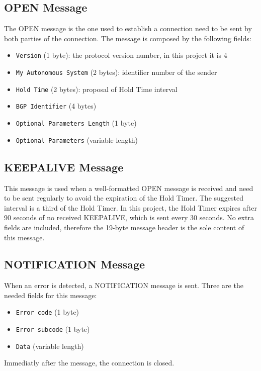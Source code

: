 \subsection{OPEN Message}
The OPEN message is the one used to establish a connection need to be sent by both parties of the connection.
The message is composed by the following fields:
\begin{itemize}
    \item \texttt{Version} (1 byte): the protocol version number, in this project it is 4
    \item \texttt{My Autonomous System} (2 bytes): identifier number of the sender
    \item \texttt{Hold Time} (2 bytes): proposal of Hold Time interval
    \item \texttt{BGP Identifier} (4 bytes)
    \item \texttt{Optional Parameters Length} (1 byte)
    \item \texttt{Optional Parameters} (variable length)
\end{itemize}


\subsection{KEEPALIVE Message}
This message is used when a well-formatted OPEN message is received and need to be sent regularly to avoid the expiration of the Hold Timer. The suggested interval is a third of the Hold Timer. In this project, the Hold Timer expires after 90 seconds of no received KEEPALIVE, which is sent every 30 seconds. No extra fields are included, therefore the 19-byte message header is the sole content of this message.


\subsection{NOTIFICATION Message}
When an error is detected, a NOTIFICATION message is sent. Three are the needed fields for this message:
\begin{itemize}
    \item \texttt{Error code} (1 byte)
    \item \texttt{Error subcode} (1 byte)
    \item \texttt{Data} (variable length)
\end{itemize}
Immediatly after the message, the connection is closed.

